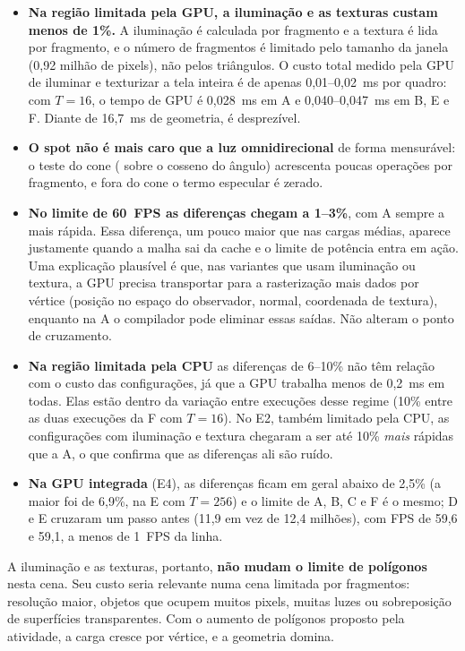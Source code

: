 \documentclass[12pt,a4paper]{article}
\newcommand{\code}[1]{\texttt{\detokenize{#1}}}
\begin{document}
\begin{itemize}
  \item \textbf{Na região limitada pela GPU, a iluminação e as texturas custam menos de 1\%.} A
        iluminação é calculada por fragmento e a textura é lida por fragmento, e o número de
        fragmentos é limitado pelo tamanho da janela (0,92 milhão de pixels), não pelos
        triângulos. O custo total medido pela GPU de iluminar e texturizar a tela inteira é de
        apenas 0,01--0,02~ms por quadro: com $T=16$, o tempo de GPU é 0,028~ms em A e
        0,040--0,047~ms em B, E e F. Diante de 16,7~ms de geometria, é desprezível.
  \item \textbf{O spot não é mais caro que a luz omnidirecional} de forma mensurável: o teste do
        cone (\code{smoothstep} sobre o cosseno do ângulo) acrescenta poucas operações por
        fragmento, e fora do cone o termo especular é zerado.
  \item \textbf{No limite de 60~FPS as diferenças chegam a 1--3\%}, com A sempre a mais rápida.
        Essa diferença, um pouco maior que nas cargas médias, aparece justamente quando a malha sai
        da cache e o limite de potência entra em ação. Uma explicação plausível é que, nas variantes
        que usam iluminação ou textura, a GPU precisa transportar para a rasterização mais dados
        por vértice (posição no espaço do observador, normal, coordenada de textura), enquanto na A
        o compilador pode eliminar essas saídas. Não alteram o ponto de cruzamento.
  \item \textbf{Na região limitada pela CPU} as diferenças de 6--10\% não têm relação com o
        custo das configurações, já que a GPU trabalha menos de 0,2~ms em todas. Elas estão dentro da
        variação entre execuções desse regime (10\% entre as duas execuções da F com $T=16$). No
        E2, também limitado pela CPU, as configurações com iluminação e textura chegaram a ser
        até 10\% \emph{mais} rápidas que a A, o que confirma que as diferenças ali são ruído.
  \item \textbf{Na GPU integrada} (E4), as diferenças ficam em geral abaixo de 2,5\% (a maior foi de 6,9\%, na E com $T=256$) e o limite de A, B, C e F
        é o mesmo; D e E cruzaram um passo antes (11,9 em vez de 12,4 milhões), com FPS de 59,6 e
        59,1, a menos de 1~FPS da linha.
\end{itemize}
A iluminação e as texturas, portanto, \textbf{não mudam o limite de polígonos} nesta cena. Seu
custo seria relevante numa cena limitada por fragmentos: resolução maior, objetos que ocupem muitos
pixels, muitas luzes ou sobreposição de superfícies transparentes. Com o aumento de polígonos
proposto pela atividade, a carga cresce por vértice, e a geometria domina.
\end{document}
